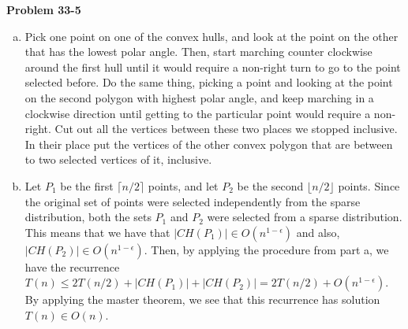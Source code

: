 \documentclass{article}
\begin{document}
\noindent\textbf{Problem 33-5}\\
\begin{enumerate}[a.]
\item
Pick one point on one of the convex hulls, and look at the point on the other that has the lowest polar angle. Then, start marching counter clockwise around the first hull until it would require a non-right turn to go to the point selected before. Do the same thing, picking a point and looking at the point on the second polygon with highest polar angle, and keep marching in a clockwise direction until getting to the particular point would require a non-right. Cut out all the vertices between these two places we stopped inclusive. In their place put the vertices of the other convex polygon that are between to two selected vertices of it, inclusive.
\item
Let $P_1$ be the first $\lceil n/2\rceil$ points, and let $P_2$ be the second $\lfloor n/2\rfloor$ points. Since the original set of points were selected independently from the sparse distribution, both the sets $P_1$ and $P_2$ were selected from a sparse distribution. This means that we have that $|CH(P_1)| \in O(n^{1-\epsilon})$ and also, $|CH(P_2)| \in O(n^{1-\epsilon})$. Then, by applying the procedure from part a, we have the recurrence $T(n) \le 2 T(n/2) + |CH(P_1)| + |CH(P_2)| = 2T(n/2) + O(n^{1-\epsilon})$. By applying the master theorem, we see that this recurrence has solution $T(n) \in O(n)$.
\end{enumerate}
\end{document}
